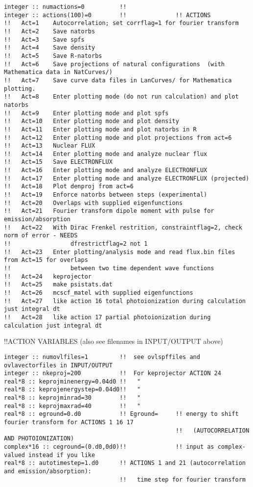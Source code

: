 \begin{verbatim}
integer :: numactions=0          !! 
integer :: actions(100)=0        !!              !! ACTIONS
!!   Act=1    Autocorrelation; set corrflag=1 for fourier transform
!!   Act=2    Save natorbs
!!   Act=3    Save spfs
!!   Act=4    Save density
!!   Act=5    Save R-natorbs
!!   Act=6    Save projections of natural configurations  (with Mathematica data in NatCurves/)
!!   Act=7    Save curve data files in LanCurves/ for Mathematica plotting.
!!   Act=8    Enter plotting mode (do not run calculation) and plot natorbs 
!!   Act=9    Enter plotting mode and plot spfs
!!   Act=10   Enter plotting mode and plot density
!!   Act=11   Enter plotting mode and plot natorbs in R
!!   Act=12   Enter plotting mode and plot projections from act=6
!!   Act=13   Nuclear FLUX 
!!   Act=14   Enter plotting mode and analyze nuclear flux
!!   Act=15   Save ELECTRONFLUX
!!   Act=16   Enter plotting mode and analyze ELECTRONFLUX 
!!   Act=17   Enter plotting mode and analyze ELECTRONFLUX (projected)
!!   Act=18   Plot denproj from act=6
!!   Act=19   Enforce natorbs between steps (experimental)
!!   Act=20   Overlaps with supplied eigenfunctions
!!   Act=21   Fourier transform dipole moment with pulse for emission/absorption
!!   Act=22   With Dirac Frenkel restrition, constraintflag=2, check norm of error - NEEDS
!!                 dfrestrictflag=2 not 1
!!   Act=23   Enter plotting/analysis mode and read flux.bin files from Act=15 for overlaps
!!                 between two time dependent wave functions
!!   Act=24   keprojector
!!   Act=25   make psistats.dat
!!   Act=26   mcscf_matel with supplied eigenfunctions 
!!   Act=27   like action 16 total photoionization during calculation just integral dt
!!   Act=28   like action 17 partial photoionization during calculation just integral dt
\end{verbatim}
!!{\large \quad ACTION VARIABLES (also see filenames in INPUT/OUTPUT above)}
\begin{verbatim}
integer :: numovlfiles=1         !!  see ovlspffiles and ovlavectorfiles in INPUT/OUTPUT
integer :: nkeproj=200           !!  For keprojector ACTION 24
real*8 :: keprojminenergy=0.04d0 !!   "
real*8 :: keprojenergystep=0.04d0!!   "
real*8 :: keprojminrad=30        !!   "
real*8 :: keprojmaxrad=40        !!   "
real*8 :: eground=0.d0           !! Eground=     !! energy to shift fourier transform for ACTIONS 1 16 17
                                                 !!   (AUTOCORRELATION AND PHOTOIONIZATION)
complex*16 :: ceground=(0.d0,0d0)!!              !! input as complex-valued instead if you like
real*8 :: autotimestep=1.d0      !! ACTIONS 1 and 21 (autocorrelation and emission/absorption):
                                 !!   time step for fourier transform
\end{verbatim}
